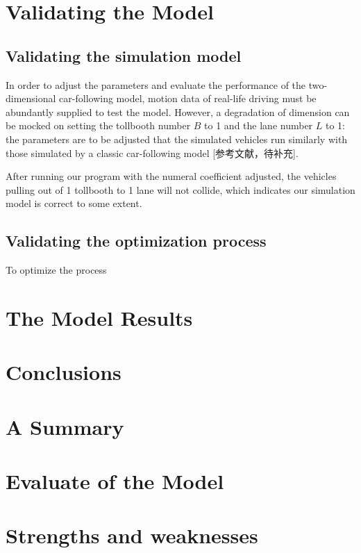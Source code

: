 \documentclass{mcmthesis}
\begin{document}
\section{Validating the Model}

\subsection{Validating the simulation model}

In order to adjust the parameters and evaluate the performance of the two-dimensional car-following model, motion data of real-life driving must be abundantly supplied to test the model. However, a degradation of dimension can be mocked on setting the tollbooth number $B$ to 1 and the lane number $L$ to 1: the parameters are to be adjusted that the simulated vehicles run similarly with those simulated by a classic car-following model [参考文献，待补充].

After running our program with the numeral coefficient adjusted, the vehicles pulling out of 1 tollbooth to 1 lane will not collide, which indicates our simulation model is correct to some extent.

\subsection{Validating the optimization process}

To optimize the process


\section{The Model Results}




\section{Conclusions}

\section{A Summary}


\section{Evaluate of the Model}

\section{Strengths and weaknesses}
\end{document}
